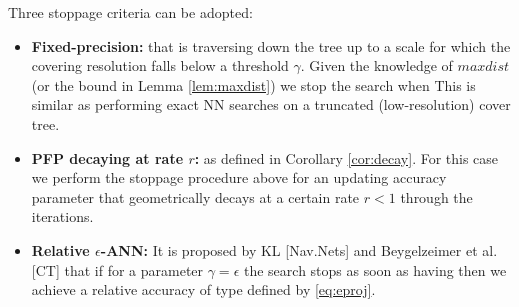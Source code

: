 Three stoppage criteria can be adopted:
\begin{itemize}
	\item \textbf{Fixed-precision:} that is traversing down the tree up to a scale for which the covering resolution falls below a threshold $\gamma$. Given the knowledge of $maxdist$ (or the bound in Lemma \ref{lem:maxdist}) we stop the search when
	 This is similar as performing exact NN searches on a truncated (low-resolution) cover tree. 
	\item \textbf{PFP decaying at rate $r$:} as defined in Corollary \ref{cor:decay}. For this case we perform the stoppage procedure above for an updating accuracy parameter 
	that geometrically decays at a certain rate $r<1$ through the iterations.
	\item \textbf{Relative $\epsilon$-ANN:} It is proposed by \nref KL [Nav.Nets] and Beygelzeimer et al. [CT] that if for a parameter $\gamma=\epsilon$ the search stops as soon as having
	then we achieve a relative accuracy of type defined by \eqref{eq:eproj}.  
\end{itemize}
